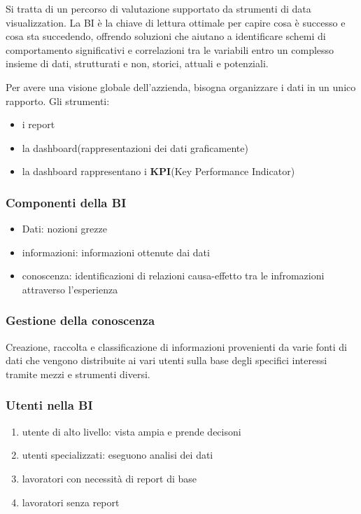 Si tratta di un percorso di valutazione supportato da strumenti di data visualizzation.
La BI è la chiave di lettura ottimale per capire cosa è successo e cosa sta succedendo,
offrendo soluzioni che aiutano a identificare schemi di comportamento significativi
e correlazioni tra le variabili entro un complesso insieme di dati, strutturati e non,
storici, attuali e potenziali.


Per avere una visione globale dell'azzienda, bisogna organizzare i dati in un unico rapporto.
Gli strumenti:
\begin{itemize}
    \item i report
    \item la dashboard(rappresentazioni dei dati graficamente)
    \item la dashboard rappresentano i \textbf{KPI}(Key Performance Indicator)
\end{itemize}

\subsubsection{Componenti della BI}
\begin{itemize}
    \item Dati: nozioni grezze
    \item informazioni: informazioni ottenute dai dati
    \item conoscenza: identificazioni di relazioni causa-effetto tra le infromazioni attraverso
    l'esperienza
\end{itemize}

\subsubsection{Gestione della conoscenza}
Creazione, raccolta e classificazione di informazioni provenienti da varie fonti
di dati che vengono distribuite ai vari utenti sulla base degli specifici interessi tramite
mezzi e strumenti diversi.

\subsubsection{Utenti nella BI}
\begin{enumerate}
    \item utente di alto livello: vista ampia e prende decisoni
    \item utenti specializzati: eseguono analisi dei dati
    \item lavoratori con necessità di report di base
    \item lavoratori senza report
\end{enumerate}

